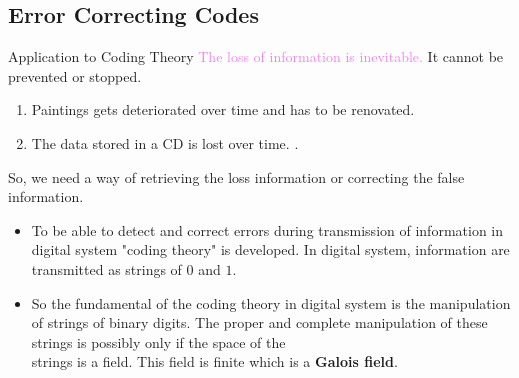 \documentclass{beamer}
\begin{document}
\subsection{Error Correcting Codes}
\begin{frame}{Application to Coding Theory}
\textcolor{violet}{The loss of information is inevitable.} It cannot be prevented or stopped.
\begin{enumerate}

\item Paintings gets deteriorated over time and has to be renovated.
\item The data stored in a CD is lost over time. \cite{coding}.
\end{enumerate}
\vspace{3mm}

So, we need a way of retrieving the loss information or correcting the false information.
\vspace{2mm}

\begin{itemize}
\item  \textcolor{green!50!black}{To be able to detect and correct errors during transmission} of information in digital system "coding theory" is developed. In digital system, information are transmitted as strings of \(0\) and \(1\).

\item So \textcolor{green!50!black}{the fundamental of the coding theory in digital system is the manipulation of strings of binary digits}. The proper and complete manipulation of these strings is possibly only if the space of the \\
  strings is a field. This field is finite which is a \textbf{Galois field}.
  \end{itemize}
\end{frame}
\end{document}
